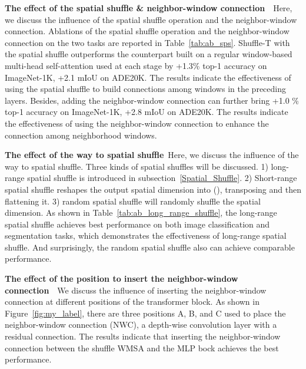\documentclass{article}
\begin{document}
\textbf{The effect of the spatial shuffle \& neighbor-window connection}~~Here, we discuss the influence of the spatial shuffle operation and the neighbor-window connection. Ablations of the spatial shuffle operation and the neighbor-window connection on the two tasks are reported in Table~\ref{tab:ab_sps}. Shuffle-T
with the spatial shuffle outperforms the counterpart built on a regular window-based multi-head self-attention used at each stage by +1.3\% top-1 accuracy on ImageNet-1K, +2.1 mIoU on ADE20K. The results indicate the effectiveness of using the spatial shuffle to build connections among windows in the preceding layers. Besides, adding the neighbor-window connection can further bring +1.0 \% top-1 accuracy on ImageNet-1K, +2.8 mIoU on ADE20K. The results indicate the effectiveness of using the neighbor-window connection to enhance the connection among neighborhood windows.

\textbf{The effect of the way to spatial shuffle}~Here, we discuss the influence of the way to spatial shuffle. Three kinds of spatial shuffles will be discussed. 1) long-range spatial shuffle is introduced in subsection~\ref{Spatial_Shuffle}. 2) Short-range spatial shuffle reshapes the output spatial dimension into (), transposing and then flattening it. 3) random spatial shuffle will randomly shuffle the spatial dimension. As shown in Table~\ref{tab:ab_long_range_shuffle}, the long-range spatial shuffle achieves best performance on both image classification and segmentation tasks, which demonstrates the effectiveness of long-range spatial shuffle. And surprisingly, the random spatial shuffle also can achieve comparable performance.

\textbf{The effect of the position to insert the neighbor-window connection}~~We discuss the influence of inserting the neighbor-window connection at different positions of the transformer block. As shown in Figure~\ref{fig:my_label}, there are three positions A, B, and C used to place the neighbor-window connection (NWC), a depth-wise convolution layer with a residual connection.  The results indicate that inserting the neighbor-window connection between the shuffle WMSA and the MLP bock achieves the best performance.
\end{document}
